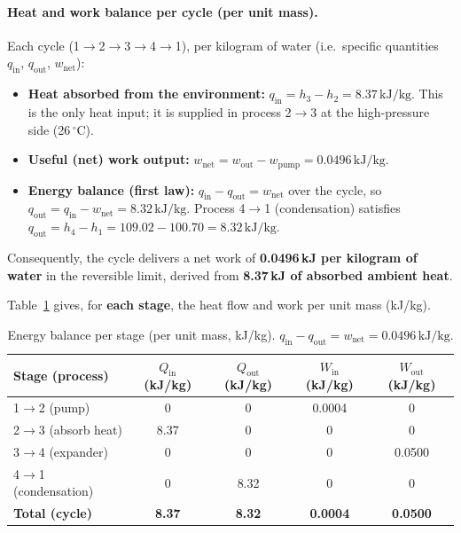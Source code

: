 \documentclass[11pt,a4paper]{article}
\begin{document}
\paragraph{Heat and work balance per cycle (per unit mass).}
Each cycle (1$\to$2$\to$3$\to$4$\to$1), per kilogram of water (i.e.\ specific quantities $q_{\mathrm{in}}$, $q_{\mathrm{out}}$, $w_{\mathrm{net}}$):
\begin{itemize}
  \item \textbf{Heat absorbed from the environment:}
  $q_{\mathrm{in}} = h_3 - h_2 = 8.37\,\mathrm{kJ}/\mathrm{kg}$.
  This is the only heat input; it is supplied in process 2$\to$3 at the
  high-pressure side (26\,$^\circ$C).
  \item \textbf{Useful (net) work output:}
  $w_{\mathrm{net}} = w_{\mathrm{out}} - w_{\mathrm{pump}} = 0.0496\,\mathrm{kJ}/\mathrm{kg}$.
  \item \textbf{Energy balance (first law):} $q_{\mathrm{in}} - q_{\mathrm{out}} = w_{\mathrm{net}}$
  over the cycle, so $q_{\mathrm{out}} = q_{\mathrm{in}} - w_{\mathrm{net}} = 8.32\,\mathrm{kJ}/\mathrm{kg}$. 
  Process 4$\to$1 (condensation) satisfies $q_{\mathrm{out}} = h_4 - h_1 = 109.02 - 100.70 = 8.32\,\mathrm{kJ}/\mathrm{kg}$.
\end{itemize}
Consequently, the cycle delivers a net work of \textbf{0.0496\,kJ per kilogram 
of water} in the reversible limit, derived from \textbf{8.37\,kJ of 
absorbed ambient heat}.

Table~\ref{tab:process_energy} gives, for \textbf{each stage}, the heat flow and work per unit mass (kJ/kg).

\begin{table}[htbp]
\centering
\caption{Energy balance per stage (per unit mass, kJ/kg). $q_{\mathrm{in}} - q_{\mathrm{out}} = w_{\mathrm{net}} = 0.0496\,\mathrm{kJ}/\mathrm{kg}$.}
\label{tab:process_energy}
\small
\begin{tabular}{@{}lcccc@{}}
\toprule
Stage (process) & $Q_{\mathrm{in}}$ (kJ/kg) & $Q_{\mathrm{out}}$ (kJ/kg) & $W_{\mathrm{in}}$ (kJ/kg) & $W_{\mathrm{out}}$ (kJ/kg) \\
\midrule
1$\to$2 (pump) & 0 & 0 & 0.0004 & 0 \\
2$\to$3 (absorb heat) & 8.37 & 0 & 0 & 0 \\
3$\to$4 (expander) & 0 & 0 & 0 & 0.0500 \\
4$\to$1 (condensation) & 0 & 8.32 & 0 & 0 \\
\midrule
\textbf{Total (cycle)} & \textbf{8.37} & \textbf{8.32} & \textbf{0.0004} & \textbf{0.0500} \\
\bottomrule
\end{tabular}
\end{table}
\end{document}

